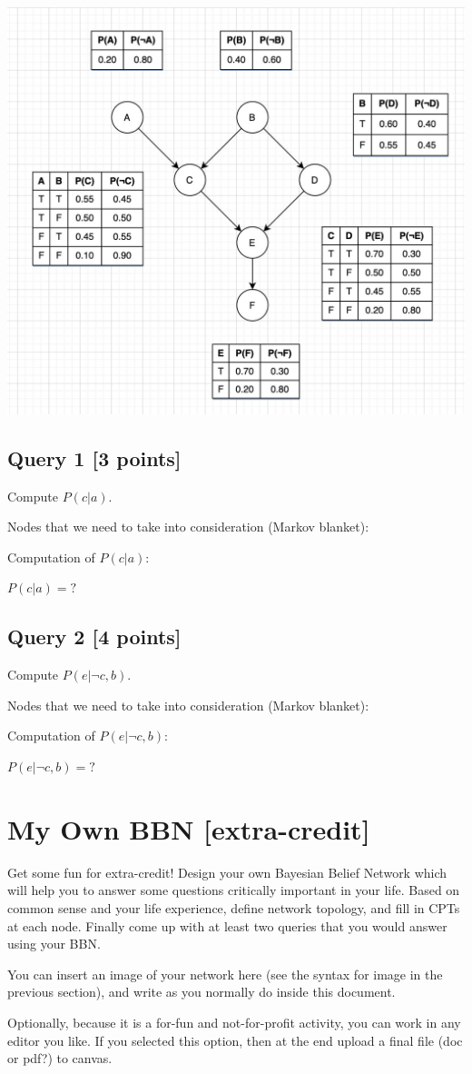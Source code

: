 \documentclass{article}
\begin{document}
\includegraphics[width=\textwidth]{bayesian_network_full.jpg}


\subsection {Query 1 [3 points]}
Compute $P(c|a)$.

Nodes that we need to take into consideration (Markov blanket):

Computation of $P(c|a)$: 

$P(c|a) = ?$

\subsection {Query 2 [4 points]}
Compute $P(e|\neg c,b)$.

Nodes that we need to take into consideration (Markov blanket):

Computation of $P(e|\neg c,b)$: 

$P(e|\neg c,b) = ?$


\newpage
\section{My Own BBN [extra-credit]}
Get some fun for extra-credit! Design your own Bayesian Belief Network which will help you to answer some questions critically important in your life. Based on common sense and your life experience, define network topology, and fill in CPTs at each node. Finally come up with at least two queries that you would answer using your BBN.

You can insert an image of your network here (see the syntax for image in the previous section), and write as you normally do inside this document.

Optionally, because it is a for-fun and not-for-profit activity, you can work in any editor you like. If you selected this option, then at the end upload a final file (doc or pdf?) to canvas.
\end{document}
